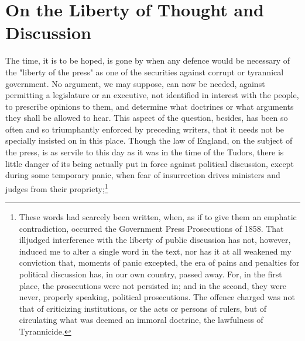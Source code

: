 \documentclass[12pt]{report}
\begin{document}
\chapter{On the Liberty of Thought and Discussion}
The time, it is to be hoped, is gone by when any defence would be necessary of the "liberty of the press" as one of the securities against corrupt or tyrannical government. No argument, we may suppose, can now be needed, against permitting a legislature or an executive, not identified in interest with the people, to prescribe opinions to them, and determine what doctrines or what arguments they shall be allowed to hear. This aspect of the question, besides, has been so often and so triumphantly enforced by preceding writers, that it needs not be specially insisted on in this place. Though the law of England, on the subject of the press, is as servile to this day as it was in the time of the Tudors, there is little danger of its being actually put in force against political discussion, except during some temporary panic, when fear of insurrection drives ministers and judges from their propriety;\footnote{These words had scarcely been written, when, as if to give them an emphatic contradiction, occurred the Government Press Prosecutions of 1858. That illjudged interference with the liberty of public discussion has not, however, induced me to alter a single word in the text, nor has it at all weakened my conviction that, moments of panic excepted, the era of pains and penalties for political discussion has, in our own country, passed away. For, in the first place, the prosecutions were not persisted in; and in the second, they were never, properly speaking, political prosecutions. The offence charged was not that of criticizing institutions, or the acts or persons of rulers, but of circulating what was deemed an immoral doctrine, the lawfulness of Tyrannicide.

}
\end{document}
